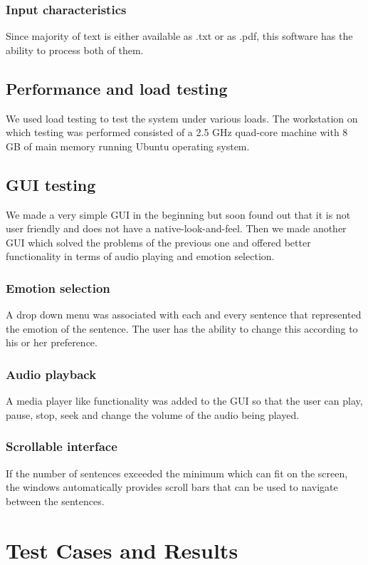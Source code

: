 \documentclass[oneside,a4paper,12pt]{book}
\begin{document}
\subsubsection{Input characteristics}
Since majority of text is either available as .txt or as .pdf, this software has the ability to process both of them.

\subsection{Performance and load testing}
We used load testing to test the system under various loads. The workstation on which testing was performed consisted of a 2.5 GHz quad-core machine with 8 GB of main memory running Ubuntu operating system.

\subsection{GUI testing}
We made a very simple GUI in the beginning but soon found out that it is not user friendly and does not have a native-look-and-feel. Then we made another GUI which solved the problems of the previous one and offered better functionality in terms of audio playing and emotion selection.
\subsubsection{Emotion selection}
A drop down menu was associated with each and every sentence that represented the emotion of the sentence. The user has the ability to change this according to his or her preference.
\subsubsection{Audio playback}
A media player like functionality was added to the GUI so that the user can play, pause, stop, seek and change the volume of the audio being played. 
\subsubsection{Scrollable interface}
If the number of sentences exceeded the minimum which can fit on the screen, the windows automatically provides scroll bars that can be used to navigate between the sentences.

\section{Test Cases and Results}
\end{document}
